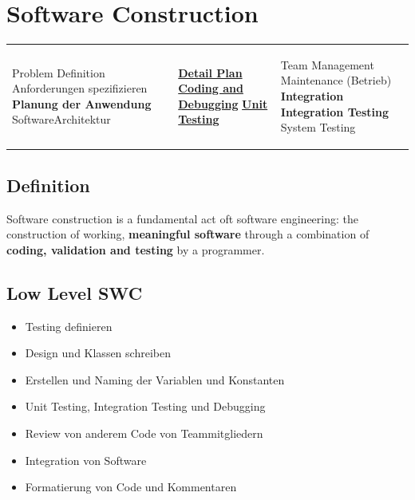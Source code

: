 \documentclass[10pt]{article}
\begin{document}
\section{Software Construction}
\begin{tabular}{p{50mm} p{50mm} p{50mm}}
	\begin{center}
		Problem Definition \newline
		Anforderungen spezifizieren\newline
		\textbf{Planung der Anwendung}\newline
		SoftwareArchitektur\newline
	\end{center}
	& 
	\begin{center}
		\textbf{\uline{Detail Plan}}\newline
		\textbf{\uline{Coding and Debugging}}\newline
		\textbf{\uline{Unit Testing}}\newline
	\end{center}
	& 
	\begin{center}
		Team Management\newline
		Maintenance (Betrieb)\newline
		\textbf{Integration}\newline
		\textbf{Integration Testing}\newline
		System Testing\newline
	\end{center}
\end{tabular}

\subsection{Definition}
Software construction is a fundamental act oft software engineering: the construction of working, \textbf{meaningful software} through a combination of \textbf{coding, validation and testing} by a programmer.
\subsection{Low Level SWC}
\begin{itemize}
	\item Testing definieren
	\item Design und Klassen schreiben
	\item Erstellen und Naming der Variablen und Konstanten
	\item Unit Testing, Integration Testing und Debugging
	\item Review von anderem Code von Teammitgliedern
	\item Integration von Software
	\item Formatierung von Code und Kommentaren
\end{itemize}
\end{document}
